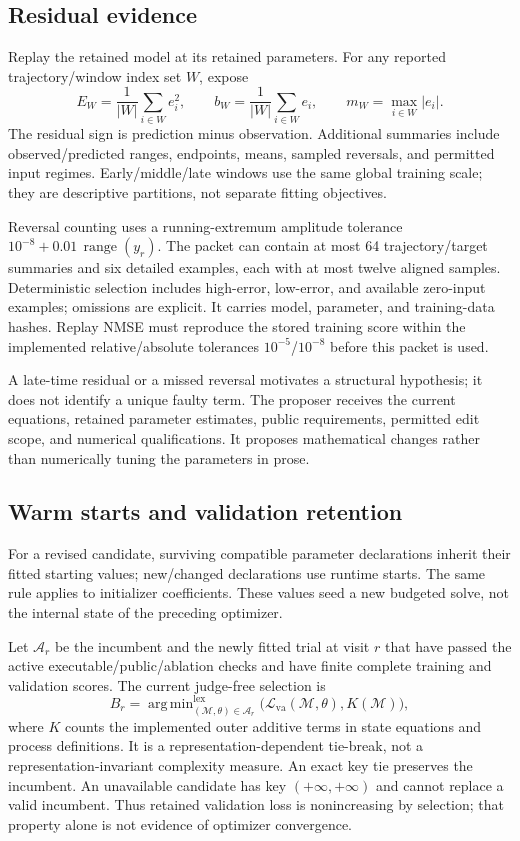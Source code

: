 \documentclass[11pt]{article}
\newcommand{\M}{\mathcal{M}}
\newcommand{\Loss}{\mathcal{L}}
\DeclareMathOperator*{\argmin}{arg\,min}
\begin{document}
\subsection{Residual evidence}
Replay the retained model at its retained parameters. For any reported
trajectory/window index set $W$, expose
\begin{equation}
 E_W=\frac1{|W|}\sum_{i\in W}e_i^2,\qquad
 b_W=\frac1{|W|}\sum_{i\in W}e_i,\qquad
 m_W=\max_{i\in W}|e_i|.
\end{equation}
The residual sign is prediction minus observation. Additional summaries include
observed/predicted ranges, endpoints, means, sampled reversals, and permitted
input regimes. Early/middle/late windows use the same global training scale;
they are descriptive partitions, not separate fitting objectives.

Reversal counting uses a running-extremum amplitude tolerance
$10^{-8}+0.01\,\operatorname{range}(y_r)$. The packet can contain at most 64
trajectory/target summaries and six detailed examples, each with at most twelve
aligned samples. Deterministic selection includes high-error, low-error, and
available zero-input examples; omissions are explicit. It carries model,
parameter, and training-data hashes. Replay NMSE must reproduce the stored
training score within the implemented relative/absolute tolerances
$10^{-5}$/$10^{-8}$ before this packet is used.

A late-time residual or a missed reversal motivates a structural hypothesis;
it does not identify a unique faulty term. The proposer receives the current
equations, retained parameter estimates, public requirements, permitted edit
scope, and numerical qualifications. It proposes mathematical changes rather
than numerically tuning the parameters in prose.

\subsection{Warm starts and validation retention}
For a revised candidate, surviving compatible parameter declarations inherit
their fitted starting values; new/changed declarations use runtime starts.
The same rule applies to initializer coefficients. These values seed a new
budgeted solve, not the internal state of the preceding optimizer.

Let $\mathcal A_r$ be the incumbent and the newly fitted trial at visit $r$ that
have passed the active executable/public/ablation checks and have finite complete
training and validation scores. The current judge-free selection is
\begin{equation}
 B_r=\argmin_{(\M,\theta)\in\mathcal A_r}^{\mathrm{lex}}
       \bigl(\Loss_{\mathrm{va}}(\M,\theta),K(\M)\bigr),
 \label{eq:selection}
\end{equation}
where $K$ counts the implemented outer additive terms in state equations and
process definitions. It is a representation-dependent tie-break, not a
representation-invariant complexity measure. An exact key tie preserves the
incumbent. An unavailable candidate has key $(+\infty,+\infty)$ and cannot
replace a valid incumbent. Thus retained validation loss is nonincreasing by
selection; that property alone is not evidence of optimizer convergence.
\end{document}
